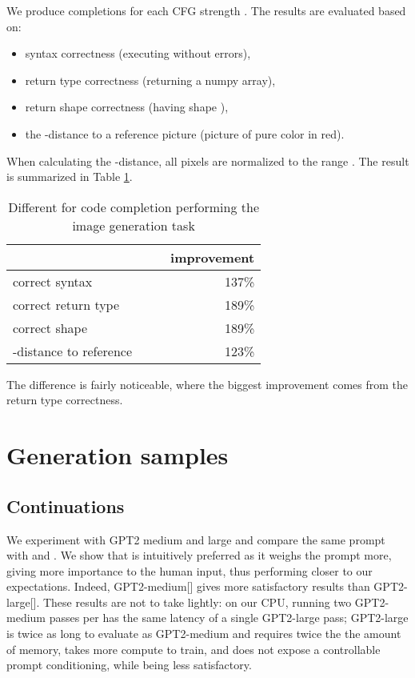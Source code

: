 \documentclass{article}
\begin{document}
We produce  completions for each CFG strength . The results are evaluated based on:
\begin{itemize}
    \item syntax correctness (executing without errors),
    \item return type correctness (returning a numpy array),
    \item return shape correctness (having shape ),
    \item the -distance to a reference picture (picture of pure color in red).
\end{itemize}
When calculating the -distance, all pixels are normalized to the range . The result is summarized in Table \ref{tab:image-gen}.
\begin{table}
    \centering
    \begin{tabular}{lccr} \toprule         &  &  & improvement \\
         \midrule
        correct syntax &  &  &  137\%\\
        correct return type &  &  & 189\% \\
        correct shape &  &  & 189\% \\
        -distance to reference &  &  & 123\% \\
        \bottomrule
    \end{tabular}
    \caption{Different  for code completion performing the image generation task}
    \label{tab:image-gen}
\end{table}

The difference is fairly noticeable, where the biggest improvement comes from the return type correctness.

\FloatBarrier


\section{Generation samples}
\label{app:samples}

\subsection{Continuations}

We experiment with GPT2 medium and large and compare the same prompt with  and . We show that  is intuitively preferred as it weighs the prompt more, giving more importance to the human input, thus performing closer to our expectations. Indeed, GPT2-medium[] gives more satisfactory results than GPT2-large[]. These results are not to take lightly: on our CPU, running two GPT2-medium passes per has the same latency of a single GPT2-large pass; GPT2-large is twice as long to evaluate as GPT2-medium and requires twice the the amount of memory, takes more compute to train, and does not expose a controllable prompt conditioning, while being less satisfactory.
\end{document}
